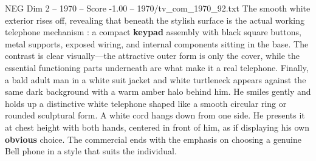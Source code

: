 \begin{textsample}{NEG Dim 2 – 1970 – Score -1.00 – 1970/tv\_com\_1970\_92.txt}
The smooth white exterior rises off, revealing that beneath the stylish surface is the actual working telephone mechanism : a compact \textbf{keypad} assembly with black square buttons, metal supports, exposed wiring, and internal components sitting in the base.
The contrast is clear visually—the attractive outer form is only the cover, while the essential functioning parts underneath are what make it a real telephone.
Finally, a bald adult man in a white suit jacket and white turtleneck appears against the same dark background with a warm amber halo behind him.
He smiles gently and holds up a distinctive white telephone shaped like a smooth circular ring or rounded sculptural form.
A white cord hangs down from one side.
He presents it at chest height with both hands, centered in front of him, as if displaying his own \textbf{obvious} choice.
The commercial ends with the emphasis on choosing a genuine Bell phone in a style that suits the individual.

\end{textsample}
